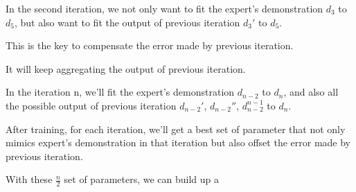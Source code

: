 \documentclass[twoside]{article}
\begin{document}
In the second iteration,  we not only want to fit the expert's demonstration $d_3$ to $d_5$, but also want to fit the output of previous iteration $d_{3}'$ to $d_5$.

This is the key to compensate the error made by previous iteration.

It will keep aggregating the output of previous iteration.

In the iteration n,  we'll fit the expert's demonstration $d_{n-2}$ to $d_n$, and also all the possible output of previous iteration $d_{n-2}'$,  $d_{n-2}''$,  $d_{n-2}^{n-1}$  to $d_n$.


After training, for each iteration, we'll get a best set of parameter that not only mimics expert's demonstration in that iteration but also offset the error made by previous iteration.

With these $\frac{n}{2}$ set of parameters, we can build up a 
\end{document}
